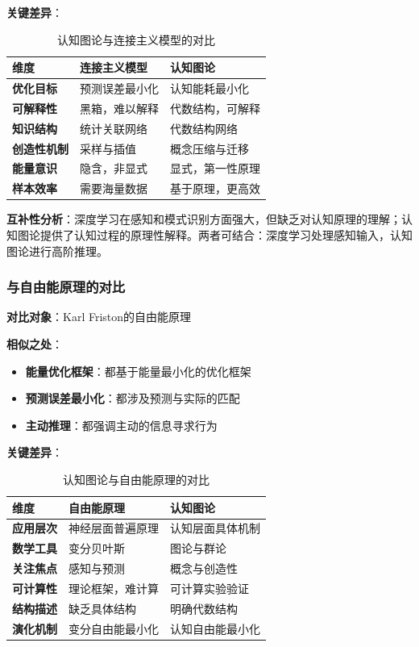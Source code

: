 \documentclass[12pt,a4paper]{article}
\begin{document}
\textbf{关键差异}：
\begin{table}[H]
\centering
\caption{认知图论与连接主义模型的对比}
\label{tab:vs_connectionist_models}
\begin{tabular}{p{3cm}p{4cm}p{4cm}}
\toprule
\textbf{维度} & \textbf{连接主义模型} & \textbf{认知图论} \\
\midrule
\textbf{优化目标} & 预测误差最小化 & 认知能耗最小化 \\
\textbf{可解释性} & 黑箱，难以解释 & 代数结构，可解释 \\
\textbf{知识结构} & 统计关联网络 & 代数结构网络 \\
\textbf{创造性机制} & 采样与插值 & 概念压缩与迁移 \\
\textbf{能量意识} & 隐含，非显式 & 显式，第一性原理 \\
\textbf{样本效率} & 需要海量数据 & 基于原理，更高效 \\
\bottomrule
\end{tabular}
\end{table}

\textbf{互补性分析}：深度学习在感知和模式识别方面强大，但缺乏对认知原理的理解；认知图论提供了认知过程的原理性解释。两者可结合：深度学习处理感知输入，认知图论进行高阶推理。

\subsubsection{与自由能原理的对比}
\label{subsubsec:vs_free_energy}

\textbf{对比对象}：Karl Friston的自由能原理 \cite{friston2010free}

\textbf{相似之处}：
\begin{itemize}
\item \textbf{能量优化框架}：都基于能量最小化的优化框架
\item \textbf{预测误差最小化}：都涉及预测与实际的匹配
\item \textbf{主动推理}：都强调主动的信息寻求行为
\end{itemize}

\textbf{关键差异}：
\begin{table}[H]
\centering
\caption{认知图论与自由能原理的对比}
\label{tab:vs_free_energy}
\begin{tabular}{p{3cm}p{4cm}p{4cm}}
\toprule
\textbf{维度} & \textbf{自由能原理} & \textbf{认知图论} \\
\midrule
\textbf{应用层次} & 神经层面普遍原理 & 认知层面具体机制 \\
\textbf{数学工具} & 变分贝叶斯 & 图论与群论 \\
\textbf{关注焦点} & 感知与预测 & 概念与创造性 \\
\textbf{可计算性} & 理论框架，难计算 & 可计算实验验证 \\
\textbf{结构描述} & 缺乏具体结构 & 明确代数结构 \\
\textbf{演化机制} & 变分自由能最小化 & 认知自由能最小化 \\
\bottomrule
\end{tabular}
\end{table}
\end{document}
